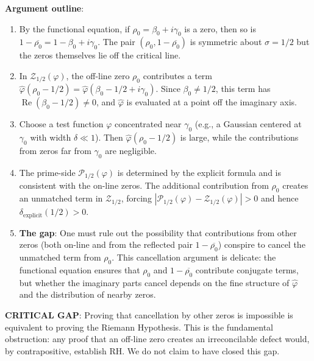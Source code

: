 \documentclass[11pt]{article}
\theoremstyle{remark}
\DeclareMathOperator{\Rea}{Re}
\begin{document}
\noindent\textbf{Argument outline}:
\begin{enumerate}
  \item By the functional equation, if $\rho_0=\beta_0+i\gamma_0$ is a zero, then so
    is $1-\overline{\rho_0}=1-\beta_0+i\gamma_0$.
    The pair $(\rho_0,1-\overline{\rho_0})$ is symmetric about $\sigma=1/2$
    but the zeros themselves lie off the critical line.

  \item In $\mathcal{Z}_{1/2}(\varphi)$, the off-line zero $\rho_0$ contributes a
    term $\hat{\varphi}(\rho_0-1/2)=\hat{\varphi}(\beta_0-1/2+i\gamma_0)$.
    Since $\beta_0\neq 1/2$, this term has $\Rea(\beta_0-1/2)\neq 0$, and
    $\hat{\varphi}$ is evaluated at a point off the imaginary axis.

  \item Choose a test function $\varphi$ concentrated near $\gamma_0$ (e.g., a
    Gaussian centered at $\gamma_0$ with width $\delta\ll 1$).
    Then $\hat{\varphi}(\rho_0-1/2)$ is large, while the contributions from zeros
    far from $\gamma_0$ are negligible.

  \item The prime-side $\mathcal{P}_{1/2}(\varphi)$ is determined by the explicit
    formula and is consistent with the on-line zeros.
    The additional contribution from $\rho_0$ creates an unmatched term in
    $\mathcal{Z}_{1/2}$, forcing
    $|\mathcal{P}_{1/2}(\varphi)-\mathcal{Z}_{1/2}(\varphi)|>0$ and hence
    $\delta_{\mathrm{explicit}}(1/2)>0$.

  \item \textbf{The gap}: One must rule out the possibility that contributions from
    other zeros (both on-line and from the reflected pair $1-\overline{\rho_0}$)
    conspire to cancel the unmatched term from $\rho_0$.
    This cancellation argument is delicate: the functional equation ensures that
    $\rho_0$ and $1-\overline{\rho_0}$ contribute conjugate terms, but whether
    the imaginary parts cancel depends on the fine structure of $\hat{\varphi}$
    and the distribution of nearby zeros.
\end{enumerate}

\noindent\textbf{\textbf{CRITICAL GAP}}: Proving that cancellation by other zeros is
impossible is equivalent to proving the Riemann Hypothesis.
This is the fundamental obstruction: any proof that an off-line zero creates an
irreconcilable defect would, by contrapositive, establish RH.
We do not claim to have closed this gap.
\end{document}
